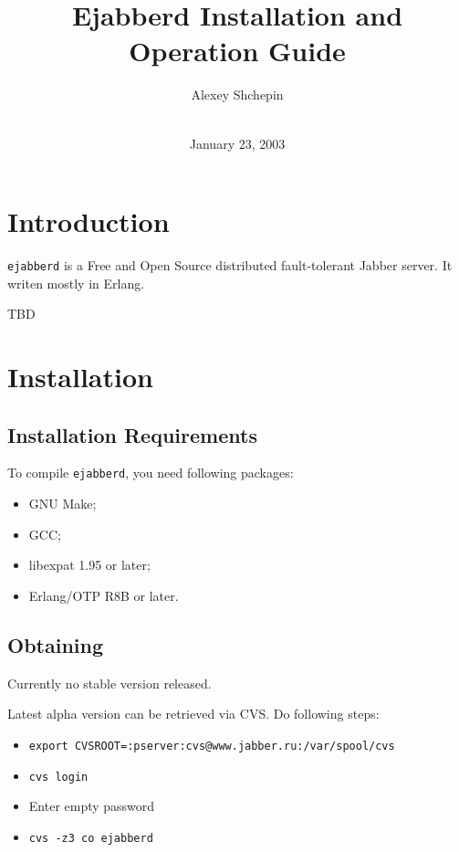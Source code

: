 \documentclass[12pt]{article}
\title{Ejabberd Installation and Operation Guide}
\author{Alexey Shchepin \\
  \ahrefurl{mailto:alexey@sevcom.net} \\
  \ahrefurl{xmpp:aleksey@jabber.ru}}
\date{January 23, 2003}
\newcommand{\ejabberd}{\texttt{ejabberd}}
\newcommand{\Jabber}{Jabber}
\begin{document}
\begin{titlepage}
  \maketitle{}
  


  {\centering
  }
\end{titlepage}
\tableofcontents{}

\newpage
\section{Introduction}
\label{sec:intro}

\ejabberd{} is a Free and Open Source distributed fault-tolerant \Jabber{}
server.  It writen mostly in Erlang.

TBD



\section{Installation}
\label{sec:installation}


\subsection{Installation Requirements}
\label{sec:installreq}

To compile \ejabberd{}, you need following packages:
\begin{itemize}
\item GNU Make;
\item GCC;
\item libexpat 1.95 or later;
\item Erlang/OTP R8B or later.
\end{itemize}

\subsection{Obtaining}
\label{sec:obtaining}

Currently no stable version released.

Latest alpha version can be retrieved via CVS.  Do following steps:
\begin{itemize}
\item \texttt{export CVSROOT=:pserver:cvs@www.jabber.ru:/var/spool/cvs}
\item \texttt{cvs login}
\item Enter empty password
\item \texttt{cvs -z3 co ejabberd}
\end{itemize}
\end{document}

